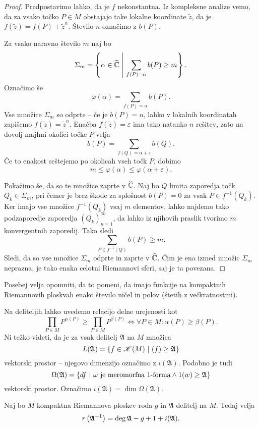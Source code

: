 \begin{proof}
Predpostavimo lahko, da je $f$ nekonstantna. Iz kompleksne analize
vemo, da za vsako točko $P \in M$ obstajajo take lokalne
koordinate $\tilde{z}$, da je $f(\tilde{z}) = f(P) + \tilde{z}^n$.
Število $n$ označimo z $b(P)$.

Za vsako naravno število $m$ naj bo
\[
\Sigma_m = \left\{\alpha \in \widehat{\mathbb{C}}~\middle\vert~\sum_{f(P)=\alpha} b(P) \geq m\right\}.
\]
Označimo še
\[
\varphi(\alpha) = \sum_{f(P)=\alpha} b(P).
\]
Vse množice $\Sigma_m$ so odprte -- če je $b(P) = n$, lahko v
lokalnih koordinatah zapišemo
$f(\tilde{z}) = \tilde{z}^n$. Enačba $f(\tilde{z}) = \varepsilon$
ima tako natanko $n$ rešitev, zato na dovolj majhni okolici točke
$P$ velja
\[
b(P) = \sum_{f(Q) = \alpha + \varepsilon} b(Q).
\]
Če to enakost seštejemo po okolicah vseh točk $P$, dobimo
\[
m \leq \varphi(\alpha) \leq \varphi(\alpha + \varepsilon).
\]

Pokažimo še, da so te množice zaprte v $\widehat{\mathbb{C}}$. Naj bo $Q$ limita
zaporedja točk $Q_k \in \Sigma_m$, pri čemer je brez škode za
splošnost $b(P) = 0$ za vsak $P \in f^{-1}(Q_k)$. Ker imajo vse
množice $f^{-1}(Q_k)$ vsaj $m$ elementov, lahko najdemo tako
podzaporedje zaporedja $(Q_k)_{n=1}^\infty$, da lahko iz njihovih
praslik tvorimo $m$ konvergentnih zaporedij. Tako sledi
\[
\sum_{P \in f^{-1}(Q)} b(P) \geq m.
\]
Sledi, da so vse množice $\Sigma_m$ odprte in zaprte v $\widehat{\mathbb{C}}$. Čim
je ena izmed množic $\Sigma_m$ neprazna, je tako enaka celotni
Riemannovi sferi, saj je ta povezana.
\end{proof}

Posebej velja opomniti, da to pomeni, da imajo funkcije na
kompaktnih Riemannovih ploskvah enako število ničel in polov
(štetih z večkratnostmi).

Na deliteljih lahko uvedemo relacijo delne urejenosti kot
\[
\prod_{P \in M} P^{\alpha(P)} \geq \prod_{P \in M} P^{\beta(P)}
\iff
\forall P \in M \colon \alpha(P) \geq \beta(P).
\]
Ni težko videti, da je za vsak delitelj $\mathfrak{A}$ na $M$
množica
\[
L(\mathfrak{A}) =
\left\{f \in \mathscr{K}(M)~\middle\vert~(f) \geq \mathfrak{A}\right\}
\]
vektorski prostor -- njegovo dimenzijo označimo z
$i(\mathfrak{A})$. Podobno je tudi
\[
\Omega(\mathfrak{A}) =
\left\{df~\middle\vert~\text{$\omega$ je meromorfna $1$-forma} \land
1(w) \geq \mathfrak{A}\right\}
\]
vektorski prostor. Označimo
$i(\mathfrak{A}) = \dim \Omega(\mathfrak{A})$.

\begin{izrek}
Naj bo $M$ kompaktna Riemannova ploskev roda $g$ in $\mathfrak{A}$
delitelj na $M$. Tedaj velja
\[
r \left(\mathfrak{A}^{-1}\right) =
\deg \mathfrak{A} - g + 1 + i(\mathfrak{A}).
\]
\end{izrek}

